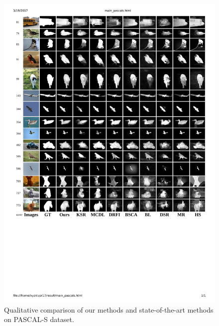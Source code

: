 \documentclass[journal]{IEEEtran}
\begin{document}
\begin{figure}[t]
\begin{center}
\includegraphics[width=\linewidth]{cmp_pascals.pdf}
\end{center}
\vspace{-10pt}
\caption{Qualitative comparison of our methods and state-of-the-art methods on PASCAL-S dataset.}
\label{cmp_pascals}
\end{figure}
\end{document}

